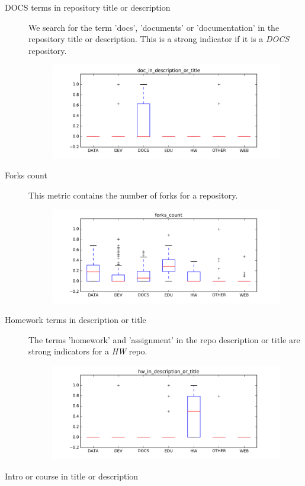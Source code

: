 \documentclass[a4paper]{scrartcl}
\begin{document}
		\begin{description}
			\item[DOCS terms in repository title or description]
				We search for the term 'docs', 'documents' or 'documentation' in the repository title or description. This is a strong indicator if it is a \emph{DOCS} repository.
				\begin{figure}[h!]
					\centering
					\includegraphics[width=0.75\linewidth]{figures/doc_in_description_or_title.png}
				\end{figure}
			\item[Forks count]
				This metric contains the number of forks for a repository.
				\begin{figure}[h!]
					\centering
					\includegraphics[width=0.75\linewidth]{figures/forks_count.png}
				\end{figure}
			\item[Homework terms in description or title]
				The terms 'homework' and 'assignment' in the repo description or title are strong indicators for a \emph{HW} repo.
				\begin{figure}[h!]
					\centering
					\includegraphics[width=0.75\linewidth]{figures/hw_in_description_or_title.png}
				\end{figure}
			\item[Intro or course in title or description]

\end{description}
\end{document}
